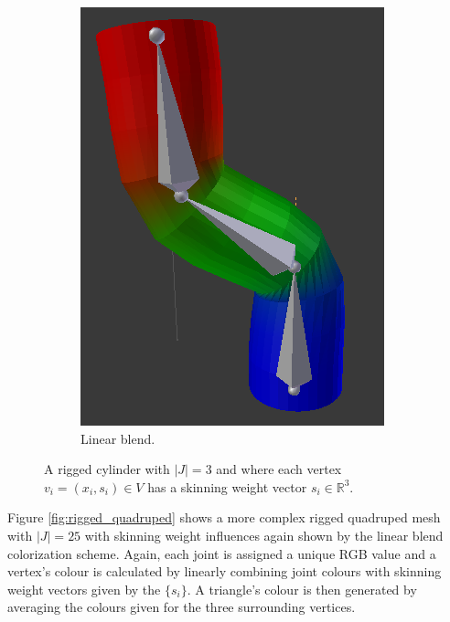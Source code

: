 \begin{figure}[H]
\begin{subfigure}{0.25\linewidth}
                \includegraphics[width=1\linewidth]{wonky_pole/linear_blend}
                \caption{Linear blend.}
            \end{subfigure}%
            \caption{A rigged cylinder with $|J| = 3$ and where each vertex $v_{i} = (x_{i}, s_{i}) \in V$ has a skinning weight vector $s_{i} \in \mathbb{R}^{3}$.}
            \label{fig:rigged_cylinder}
        \end{figure}

        Figure \ref{fig:rigged_quadruped} shows a more complex rigged quadruped mesh with $|J| = 25$ with skinning weight influences again shown by the linear blend colorization scheme. Again, each joint is assigned a unique RGB value and a vertex's colour is calculated by linearly combining joint colours with skinning weight vectors given by the $\{s_{i}\}$. A triangle's colour is then generated by averaging the colours given for the three surrounding vertices.

